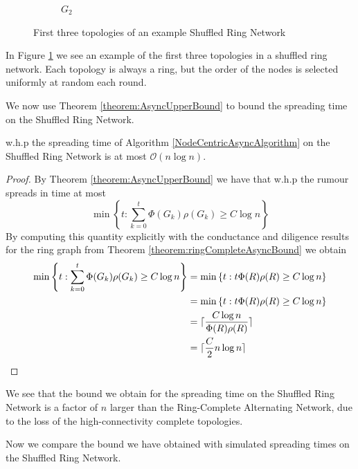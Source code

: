 \begin{figure}[h]
\begin{subfigure}[b]{0.3\textwidth}
		\caption*{$G_2$}
	\end{subfigure}
	\caption{First three topologies of an example Shuffled Ring Network}
	\label{fig:shuffledRingExample}
\end{figure}

In Figure \ref{fig:shuffledRingExample} we see an example of the first three topologies in a shuffled ring network. Each topology is always a ring, but the order of the nodes is selected uniformly at random each round.

We now use Theorem \ref{theorem:AsyncUpperBound} to bound the spreading time on the Shuffled Ring Network.

\begin{theorem}
	w.h.p the spreading time of Algorithm \ref{NodeCentricAsyncAlgorithm} on the Shuffled Ring Network is at most $\mathcal{O}(n \log n)$.
\end{theorem}

\begin{proof}
	By Theorem \ref{theorem:AsyncUpperBound} we have that w.h.p the rumour spreads in time at most 
	$$
		\min \left\{t : \sum_{k=0}^t \Phi(G_k)\rho(G_k) \geq C \log n \right\} 
	$$
	By computing this quantity explicitly with the conductance and diligence results for the ring graph from Theorem \ref{theorem:ringCompleteAsyncBound} we obtain
	\begin{align*}
		\min \left\{t : \sum_{k=0}^t \Phi(G_k)\rho(G_k) \geq C \log n \right\} 
		&= \min \left\{t : t \Phi(R)\rho(R) \geq C \log n \right\} \\
		&= \min \left\{t : t \Phi(R)\rho(R) \geq C \log n \right\} \\
		&= \lceil\frac{C \log n}{\Phi(R)\rho(R)}\rceil \\
		&= \lceil\frac{C}{2}n \log n\rceil
	\end{align*}
\end{proof}

We see that the bound we obtain for the spreading time on the Shuffled Ring Network is a factor of $n$ larger than the Ring-Complete Alternating Network, due to the loss of the high-connectivity complete topologies. %

Now we compare the bound we have obtained with simulated spreading times on the Shuffled Ring Network.

